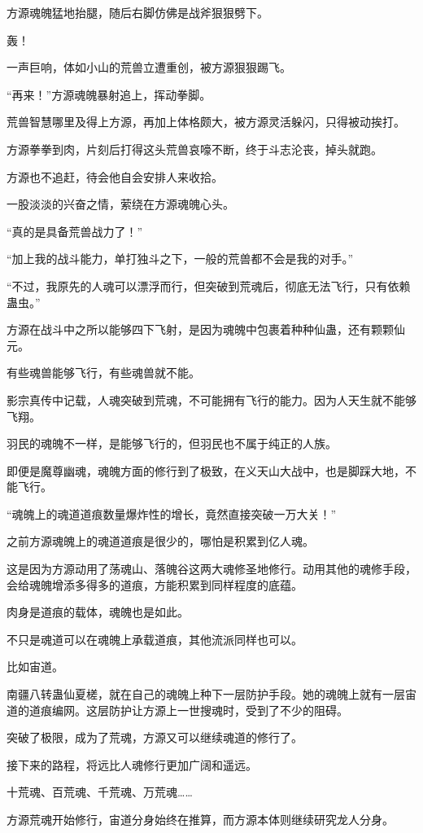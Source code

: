 \begin{this_body}
方源魂魄猛地抬腿，随后右脚仿佛是战斧狠狠劈下。

轰！

一声巨响，体如小山的荒兽立遭重创，被方源狠狠踢飞。

“再来！”方源魂魄暴射追上，挥动拳脚。

荒兽智慧哪里及得上方源，再加上体格颇大，被方源灵活躲闪，只得被动挨打。

方源拳拳到肉，片刻后打得这头荒兽哀嚎不断，终于斗志沦丧，掉头就跑。

方源也不追赶，待会他自会安排人来收拾。

一股淡淡的兴奋之情，萦绕在方源魂魄心头。

“真的是具备荒兽战力了！”

“加上我的战斗能力，单打独斗之下，一般的荒兽都不会是我的对手。”

“不过，我原先的人魂可以漂浮而行，但突破到荒魂后，彻底无法飞行，只有依赖蛊虫。”

方源在战斗中之所以能够四下飞射，是因为魂魄中包裹着种种仙蛊，还有颗颗仙元。

有些魂兽能够飞行，有些魂兽就不能。

影宗真传中记载，人魂突破到荒魂，不可能拥有飞行的能力。因为人天生就不能够飞翔。

羽民的魂魄不一样，是能够飞行的，但羽民也不属于纯正的人族。

即便是魔尊幽魂，魂魄方面的修行到了极致，在义天山大战中，也是脚踩大地，不能飞行。

“魂魄上的魂道道痕数量爆炸性的增长，竟然直接突破一万大关！”

之前方源魂魄上的魂道道痕是很少的，哪怕是积累到亿人魂。

这是因为方源动用了荡魂山、落魄谷这两大魂修圣地修行。动用其他的魂修手段，会给魂魄增添多得多的道痕，方能积累到同样程度的底蕴。

肉身是道痕的载体，魂魄也是如此。

不只是魂道可以在魂魄上承载道痕，其他流派同样也可以。

比如宙道。

南疆八转蛊仙夏槎，就在自己的魂魄上种下一层防护手段。她的魂魄上就有一层宙道的道痕编网。这层防护让方源上一世搜魂时，受到了不少的阻碍。

突破了极限，成为了荒魂，方源又可以继续魂道的修行了。

接下来的路程，将远比人魂修行更加广阔和遥远。

十荒魂、百荒魂、千荒魂、万荒魂……

方源荒魂开始修行，宙道分身始终在推算，而方源本体则继续研究龙人分身。


\end{this_body}
